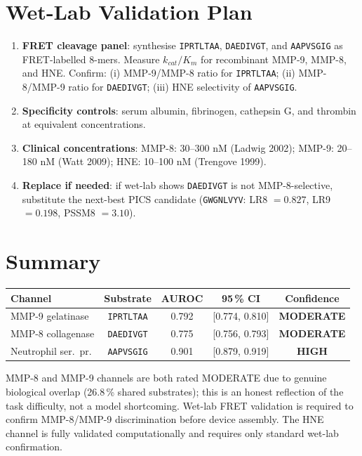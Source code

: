 \documentclass[10pt,a4paper]{article}
\newcommand{\seq}[1]{\texttt{#1}}
\newcommand{\hi}[1]{\textcolor{highgreen}{\textbf{#1}}}
\newcommand{\md}[1]{\textcolor{modamber}{\textbf{#1}}}
\begin{document}
\section{Wet-Lab Validation Plan}

\begin{enumerate}[leftmargin=*,topsep=2pt,itemsep=2pt]
  \item \textbf{FRET cleavage panel}: synthesise \seq{IPRTLTAA},
    \seq{DAEDIVGT}, and \seq{AAPVSGIG} as FRET-labelled 8-mers.
    Measure $k_{cat}/K_m$ for recombinant MMP-9, MMP-8, and HNE.
    Confirm: (i) MMP-9/MMP-8 ratio for \seq{IPRTLTAA}; (ii) MMP-8/MMP-9
    ratio for \seq{DAEDIVGT}; (iii) HNE selectivity of \seq{AAPVSGIG}.
  \item \textbf{Specificity controls}: serum albumin, fibrinogen,
    cathepsin G, and thrombin at equivalent concentrations.
  \item \textbf{Clinical concentrations}: MMP-8: 30--300 nM (Ladwig 2002);
    MMP-9: 20--180 nM (Watt 2009); HNE: 10--100 nM (Trengove 1999).
  \item \textbf{Replace if needed}: if wet-lab shows \seq{DAEDIVGT} is
    not MMP-8-selective, substitute the next-best PICS candidate
    (\seq{GWGNLVYV}: LR8 $= 0.827$, LR9 $= 0.198$, PSSM8 $= 3.10$).
\end{enumerate}

\section{Summary}

\begin{center}
\small
\begin{tabular}{lcccc}
  \toprule
  Channel & Substrate & AUROC & 95\,\% CI & Confidence\\
  \midrule
  MMP-9 gelatinase    & \seq{IPRTLTAA} & 0.792 & [0.774, 0.810] & \md{MODERATE}\\
  MMP-8 collagenase   & \seq{DAEDIVGT} & 0.775 & [0.756, 0.793] & \md{MODERATE}\\
  Neutrophil ser.\ pr.& \seq{AAPVSGIG} & 0.901 & [0.879, 0.919] & \hi{HIGH}\\
  \bottomrule
\end{tabular}
\end{center}

MMP-8 and MMP-9 channels are both rated MODERATE due to genuine
biological overlap (26.8\,\% shared substrates); this is an honest
reflection of the task difficulty, not a model shortcoming.  Wet-lab
FRET validation is required to confirm MMP-8/MMP-9 discrimination before
device assembly.  The HNE channel is fully validated computationally
and requires only standard wet-lab confirmation.
\end{document}
